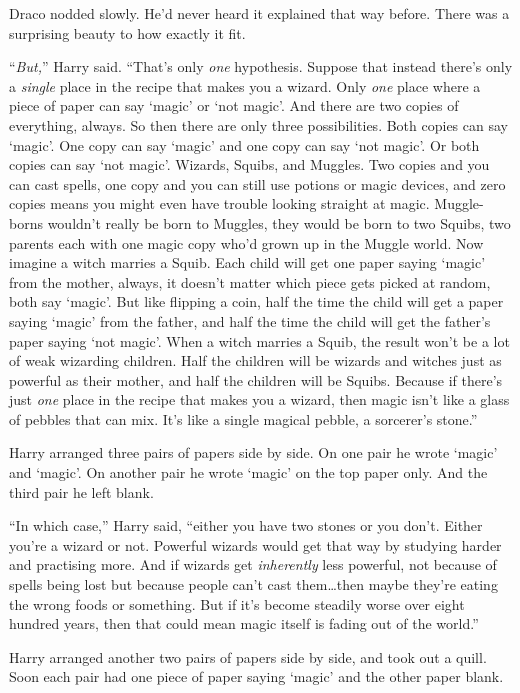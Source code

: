 Draco nodded slowly. He’d never heard it explained that way before. There was a surprising beauty to how exactly it fit.

“\emph{But,}” Harry said. “That’s only \emph{one} hypothesis. Suppose that instead there’s only a \emph{single} place in the recipe that makes you a wizard. Only \emph{one} place where a piece of paper can say ‘magic’ or ‘not magic’. And there are two copies of everything, always. So then there are only three possibilities. Both copies can say ‘magic’. One copy can say ‘magic’ and one copy can say ‘not magic’. Or both copies can say ‘not magic’. Wizards, Squibs, and Muggles. Two copies and you can cast spells, one copy and you can still use potions or magic devices, and zero copies means you might even have trouble looking straight at magic. Muggle-borns wouldn’t really be born to Muggles, they would be born to two Squibs, two parents each with one magic copy who’d grown up in the Muggle world. Now imagine a witch marries a Squib. Each child will get one paper saying ‘magic’ from the mother, always, it doesn’t matter which piece gets picked at random, both say ‘magic’. But like flipping a coin, half the time the child will get a paper saying ‘magic’ from the father, and half the time the child will get the father’s paper saying ‘not magic’. When a witch marries a Squib, the result won’t be a lot of weak wizarding children. Half the children will be wizards and witches just as powerful as their mother, and half the children will be Squibs. Because if there’s just \emph{one} place in the recipe that makes you a wizard, then magic isn’t like a glass of pebbles that can mix. It’s like a single magical pebble, a sorcerer’s stone.”

Harry arranged three pairs of papers side by side. On one pair he wrote ‘magic’ and ‘magic’. On another pair he wrote ‘magic’ on the top paper only. And the third pair he left blank.

“In which case,” Harry said, “either you have two stones or you don’t. Either you’re a wizard or not. Powerful wizards would get that way by studying harder and practising more. And if wizards get \emph{inherently} less powerful, not because of spells being lost but because people can’t cast them…then maybe they’re eating the wrong foods or something. But if it’s become steadily worse over eight hundred years, then that could mean magic itself is fading out of the world.”

Harry arranged another two pairs of papers side by side, and took out a quill. Soon each pair had one piece of paper saying ‘magic’ and the other paper blank.

